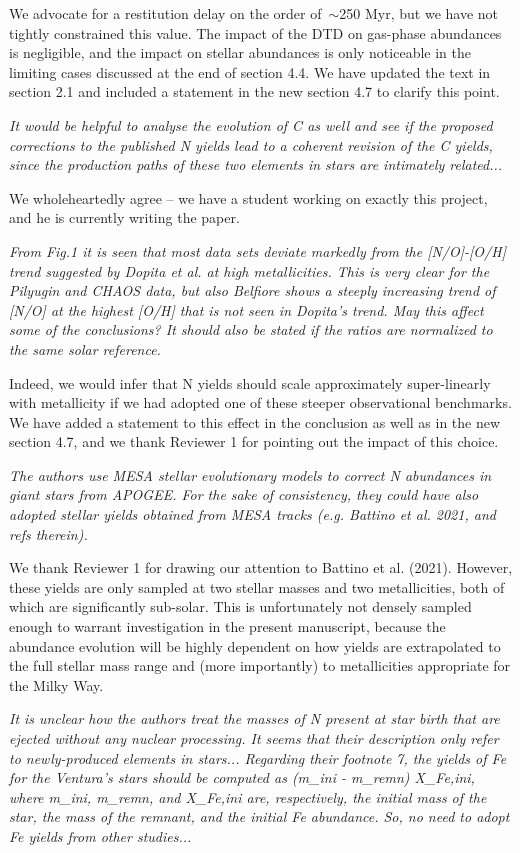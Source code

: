 \documentclass[12pt]{article}
\newcommand\doublebreak[0]{\par\null\par\noindent}
\begin{document}
We advocate for a restitution delay on the order of~$\sim$250 Myr, but we have
not tightly constrained this value.
The impact of the DTD on gas-phase
abundances is negligible, and the impact on stellar abundances is only
noticeable in the limiting cases discussed at the end of section 4.4.
We have updated the text in section 2.1 and included a statement in the new
section 4.7 to clarify this point.
\doublebreak
\textit{%
It would be helpful to analyse the evolution of C as well and see if the
proposed corrections to the published N yields lead to a coherent revision of
the C yields, since the production paths of these two elements in stars are
intimately related...
}
\doublebreak
We wholeheartedly agree -- we have a student working on exactly this project,
and he is currently writing the paper.
\doublebreak
\textit{%
From Fig.1 it is seen that most data sets deviate markedly from the [N/O]-[O/H]
trend suggested by Dopita et al. at high metallicities. This is very clear for
the Pilyugin and CHAOS data, but also Belfiore shows a steeply increasing trend
of [N/O] at the highest [O/H] that is not seen in Dopita's trend. May this
affect some of the conclusions? It should also be stated if the ratios are
normalized to the same solar reference.
}
\doublebreak
Indeed, we would infer that N yields should scale approximately super-linearly
with metallicity if we had adopted one of these steeper observational
benchmarks.
We have added a statement to this effect in the conclusion as well as in the
new section 4.7, and we thank Reviewer 1 for pointing out the impact of this
choice.
\doublebreak
\textit{%
The authors use MESA stellar evolutionary models to correct N abundances in
giant stars from APOGEE. For the sake of consistency, they could have also
adopted stellar yields obtained from MESA tracks (e.g. Battino et al. 2021, and
refs therein).
}
\doublebreak
We thank Reviewer 1 for drawing our attention to Battino et al. (2021).
However, these yields are only sampled at two stellar masses and two
metallicities, both of which are significantly sub-solar.
This is unfortunately not densely sampled enough to warrant investigation in
the present manuscript, because the abundance evolution will be highly
dependent on how yields are extrapolated to the full stellar mass range and
(more importantly) to metallicities appropriate for the Milky Way.
\doublebreak
\textit{%
It is unclear how the authors treat the masses of N present at star birth that
are ejected without any nuclear processing. It seems that their description only
refer to newly-produced elements in stars... Regarding their footnote 7, the
yields of Fe for the Ventura's stars should be computed as (m\_ini - m\_remn)
X\_Fe,ini, where m\_ini, m\_remn, and X\_Fe,ini are, respectively, the initial
mass of the star, the mass of the remnant, and the initial Fe abundance. So, no
need to adopt Fe yields from other studies...
}
\end{document}
